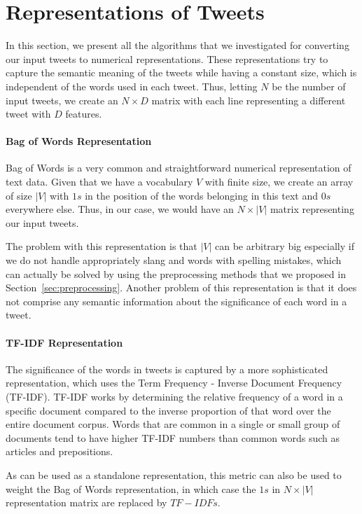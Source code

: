 \section{Representations of Tweets}
\label{sec:tweetRepresentations}

In this section, we present all the algorithms that we investigated for converting our input tweets to numerical representations.
These representations try to capture the semantic meaning of the tweets 
while having a constant size, which is independent of the words used in each tweet.
Thus, letting $N$ be the number of input tweets, we create an $N \times D$ matrix
with each line representing a different tweet with $D$ features.


\paragraph{\textbf{Bag of Words Representation}}
Bag of Words \cite{harris1954distributional} is a very common and straightforward numerical representation of text data.
Given that we have a vocabulary $V$ with finite size, we create
an array of size $|V|$ with $1s$ in the position of the words belonging in this text and $0s$ everywhere else.
Thus, in our case, we would have an $N \times |V|$ matrix representing our input tweets.

The problem with this representation is that $|V|$ can be arbitrary big especially if we do not handle appropriately slang and words with spelling mistakes, which can actually be solved by using the preprocessing methods that we proposed in Section~\ref{sec:preprocessing}. 
Another problem of this representation is that it does not comprise any semantic information about the significance of each word in a tweet. 


\paragraph{\textbf{TF-IDF Representation}}
The significance of the words in tweets is captured by a more sophisticated representation, which uses the Term Frequency - Inverse Document Frequency (TF-IDF).
TF-IDF \cite{sparck1972statistical} works by determining the relative frequency of a word in a specific document compared to the inverse proportion of that word over the entire document corpus.
Words that are common in a single or small group of documents tend to have higher TF-IDF numbers than common words such as articles and prepositions. 

As can be used as a standalone representation, this metric can also be used to weight the Bag of Words representation, in which case the $1s$ in $N \times |V|$  representation matrix are replaced by $TF-IDFs$.


